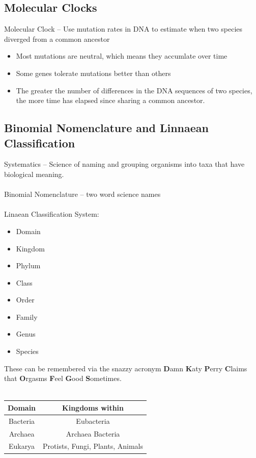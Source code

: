 \documentclass{article}
\begin{document}
\subsection{Molecular Clocks}
Molecular Clock -- Use mutation rates in DNA to estimate when two species diverged from a common ancestor
\begin{itemize}
\item Most mutations are neutral, which means they accumlate over time
\item Some genes tolerate mutations better than others
\item The greater the number of differences in the DNA sequences of two species, the more time has elapsed since sharing a common ancestor.
\end{itemize}

\subsection{Binomial Nomenclature and Linnaean Classification}
Systematics -- Science of naming and grouping organisms into taxa that have biological meaning.\\
\\
Binomial Nomenclature -- two word science names\\
\\
Linaean Classification System:
\begin{itemize}
\item Domain
\item Kingdom
\item Phylum
\item Class
\item Order
\item Family
\item Genus
\item Species
\end{itemize}
These can be remembered via the snazzy acronym  \textbf{D}amn \textbf{K}aty \textbf{P}erry \textbf{C}laims that \textbf{O}rgasms \textbf{F}eel \textbf{G}ood \textbf{S}ometimes.\\
\\
\begin{tabular}{| c | c |}
\hline
Domain & Kingdoms within\\
\hline
Bacteria & Eubacteria\\
\hline
Archaea & Archaea Bacteria\\
\hline
Eukarya & Protists, Fungi, Plants, Animals\\
\hline

\end{tabular}
\newpage
\end{document}
